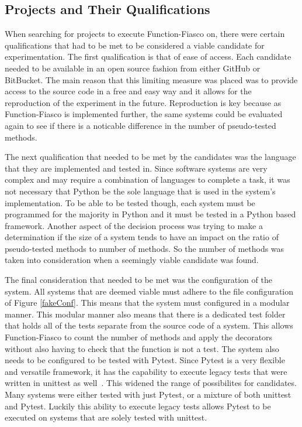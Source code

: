 \subsection{Projects and Their Qualifications}

When searching for projects to execute Function-Fiasco on, there were certain qualifications that had to be met to be considered a viable candidate for experimentation. The first qualification is that of ease of access. Each candidate needed to be available in an open source fashion from either GitHub or BitBucket. The main reason that this limiting measure was placed was to provide access to the source code in a free and easy way and it allows for the reproduction of the experiment in the future. Reproduction is key because as Function-Fiasco is implemented further, the same systems could be evaluated again to see if there is a noticable difference in the number of pseudo-tested methods.

The next qualification that needed to be met by the candidates was the language that they are implemented and tested in. Since software systems are very complex and may require a combination of languages to complete a task, it was not necessary that Python be the sole language that is used in the system's implementation. To be able to be tested though, each system must be programmed for the majority in Python and it must be tested in a Python based framework. Another aspect of the decision process was trying to make a determination if the size of a system tends to have an impact on the ratio of pseudo-tested methods to number of methods. So the number of methods was taken into consideration when a seemingly viable candidate was found.

The final consideration that needed to be met was the configuration of the system. All systems that are deemed viable must adhere to the file configuration of Figure \ref{fakeConf}. This means that the system must configured in a modular manner. This modular manner also means that there is a dedicated test folder that holds all of the tests separate from the source code of a system. This allows Function-Fiasco to count the number of methods and apply the decorators without also having to check that the function is not a test. The system also needs to be configured to be tested with Pytest. Since Pytest is a very flexible and versatile framework, it has the capability to execute legacy tests that were written in unittest as well~\cite{okken_2018}. This widened the range of possibilites for candidates. Many systems were either tested with just Pytest, or a mixture of both unittest and Pytest. Luckily this ability to execute legacy tests allows Pytest to be executed on systems that are solely tested with unittest.

